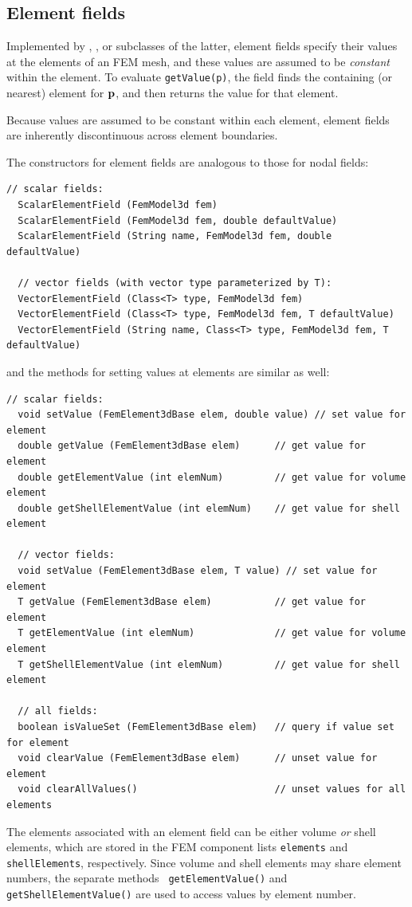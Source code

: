 \subsection{Element fields}

Implemented by
,
, 
or subclasses of the latter, element fields specify their values at
the elements of an FEM mesh, and these values are assumed to be {\it
constant} within the element. To evaluate {\tt getValue(p)}, the field
finds the containing (or nearest) element for ${\bf p}$, and then returns
the value for that element.

\begin{sideblock}
Because values are assumed to be constant within each element, element
fields are inherently discontinuous across element boundaries.
\end{sideblock}

The constructors for element fields are analogous to those
for nodal fields:
%
\begin{lstlisting}[]
  // scalar fields:
  ScalarElementField (FemModel3d fem)
  ScalarElementField (FemModel3d fem, double defaultValue)
  ScalarElementField (String name, FemModel3d fem, double defaultValue)

  // vector fields (with vector type parameterized by T):
  VectorElementField (Class<T> type, FemModel3d fem)
  VectorElementField (Class<T> type, FemModel3d fem, T defaultValue)
  VectorElementField (String name, Class<T> type, FemModel3d fem, T defaultValue)
\end{lstlisting}
%
and the methods for setting values at elements are similar as
well:
%
\begin{lstlisting}[]
  // scalar fields:
  void setValue (FemElement3dBase elem, double value) // set value for element
  double getValue (FemElement3dBase elem)      // get value for element
  double getElementValue (int elemNum)         // get value for volume element
  double getShellElementValue (int elemNum)    // get value for shell element

  // vector fields:
  void setValue (FemElement3dBase elem, T value) // set value for element
  T getValue (FemElement3dBase elem)           // get value for element
  T getElementValue (int elemNum)              // get value for volume element
  T getShellElementValue (int elemNum)         // get value for shell element

  // all fields:
  boolean isValueSet (FemElement3dBase elem)   // query if value set for element
  void clearValue (FemElement3dBase elem)      // unset value for element
  void clearAllValues()                        // unset values for all elements
\end{lstlisting}
%
The elements associated with an element field can be either volume
{\it or} shell elements, which are stored in the FEM component lists
{\tt elements} and {\tt shellElements}, respectively. Since volume and
shell elements may share element numbers, the separate methods {\tt
getElementValue()} and {\tt getShellElementValue()} are used to access
values by element number.


